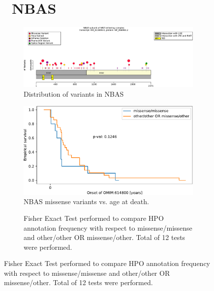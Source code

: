 \begin{figure}[htbp]
\section*{ NBAS}
\centering
\begin{subfigure}[b]{0.5\textwidth}
\centering
\includegraphics[width=\textwidth]{ img/NBAS_protein_diagram.pdf} 
\captionsetup{justification=raggedright,singlelinecheck=false}
\caption{Distribution of variants in NBAS}
\end{subfigure}
\begin{subfigure}[b]{0.48\textwidth}
\centering
\includegraphics[width=\textwidth]{ img/NBAS_stats.pdf} 
\captionsetup{justification=raggedright,singlelinecheck=false}
\caption{NBAS missense variants vs. age at death.}
\end{subfigure}

\vspace{2em}

\begin{subfigure}[b]{0.95\textwidth}
\centering
{}
\captionsetup{justification=raggedright,singlelinecheck=false}
\caption{Fisher Exact Test performed to compare HPO annotation frequency with respect to missense/missense and other/other OR missense/other. Total of
        12 tests were performed. }
\end{subfigure}


\end{figure}
